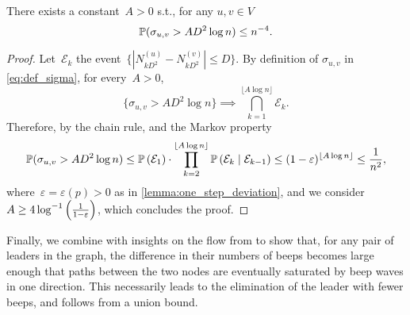 \documentclass{article}
\begin{document}
\begin{lemma} \label{lemma:upper_bound_tau}
    There exists a constant~$A > 0$ s.t., for any $u,v \in V$
    \begin{equation*}
        \operatorname{\mathbb{P}}(\sigma_{u,v} > A D^2 \log n) \leq n^{-4}.
    \end{equation*}
\end{lemma}
\begin{proof}
   Let~$\mathcal{E}_k$ the event~$\{|N^{(u)}_{k D^2} - N^{(v)}_{k D^2}| \leq D\}$.
    By definition of $\sigma_{u,v}$ in \cref{eq:def_sigma}, for every~$A > 0$,
    \begin{equation*}
        \{ \sigma_{u,v} > A D^2 \log n \} \implies \bigcap_{k=1}^{\lfloor A \log n \rfloor} \mathcal{E}_k.
    \end{equation*}
    Therefore, by the chain rule,  and the Markov property 
    \begin{equation*}
        \operatorname{\mathbb{P}}(\sigma_{u,v} > A D^2 \log n) \leq \operatorname{\mathbb{P}} \left(  \mathcal{E}_1  \right) \cdot \prod_{k=2}^{\lfloor A \log n \rfloor} \operatorname{\mathbb{P}} \left(  \mathcal{E}_k \mid \mathcal{E}_{k-1}  \right) \leq (1-\varepsilon)^{\lfloor A \log n \rfloor} \leq \frac{1}{n^2},
    \end{equation*}
    where~$\varepsilon = \varepsilon(p)>0$ as in \cref{lemma:one_step_deviation}, and we consider $A \geq 4 \log^{-1}\left( \frac{1}{1-\varepsilon} \right)$, which concludes the proof.
\end{proof}


Finally, we combine  with insights on the flow from  to show that, for any pair of leaders in the graph, the difference in their numbers of beeps becomes large enough that paths between the two nodes are eventually saturated by beep waves in one direction. This necessarily leads to the elimination of the leader with fewer beeps, and  follows from a union bound.
\end{document}
